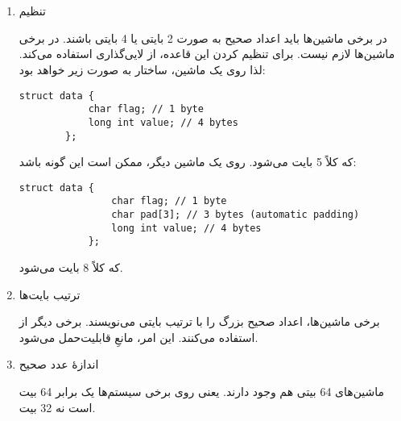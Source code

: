\section{}
\paragraph{}\label{answer:71}
\begin{enumerate}
    \item تنظیم

    در برخی ماشین‌ها باید اعداد صحیح به صورت 2 بایتی یا 4 بایتی باشند. در برخی ماشین‌ها لازم نیست.  برای تنظیم کردن این قاعده، از لایی‌گذاری استفاده می‌کند. لذا روی یک ماشین، ساختار به صورت زیر خواهد بود:
    \begin{LTR}
        \begin{lstlisting}[style=C++Style]
        struct data {
            char flag; // 1 byte
            long int value; // 4 bytes
        };
        \end{lstlisting}
    \end{LTR}

    که کلاً 5 بایت می‌شود. روی یک ماشین دیگر، ممکن است این گونه باشد:
    \begin{LTR}
        \begin{lstlisting}[style=C++Style]
            struct data {
                char flag; // 1 byte
                char pad[3]; // 3 bytes (automatic padding)
                long int value; // 4 bytes
            };
        \end{lstlisting}
    \end{LTR}

    که کلاً 8 بایت می‌شود.

    \item ترتیب بایت‌ها

    برخی ماشین‌ها، اعداد صحیح بزرگ را با ترتیب بایتی  می‌نویسند. برخی دیگر از  استفاده می‌کنند. این امر، مانعِ قابلیت‌حمل می‌شود.

    \item اندازهٔ عدد صحیح

    ماشین‌های 64 بیتی هم وجود دارند. یعنی روی برخی سیستم‌ها یک  برابر 64 بیت است نه 32 بیت.
\end{enumerate}